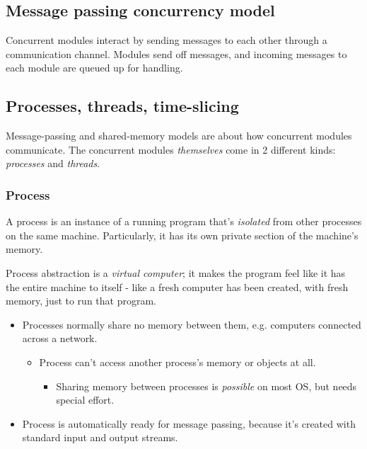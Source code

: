 \documentclass[10pt]{amsart}
\begin{document}
\subsection{Message passing concurrency model}

Concurrent modules interact by sending messages to each other through a communication channel. Modules send off messages, and incoming messages to each module are queued up for handling.

\subsection{Processes, threads, time-slicing}

Message-passing and shared-memory models are about how concurrent modules communicate. The concurrent modules \emph{themselves} come in 2 different kinds: \emph{processes} and \emph{threads}. \\

\subsubsection{Process}

A process is an instance of a running program that's \emph{isolated} from other processes on the same machine. Particularly, it has its own private section of the machine's memory.

Process abstraction is a \emph{virtual computer}; it makes the program feel like it has the entire machine to itself - like a fresh computer has been created, with fresh memory, just to run that program.

\begin{itemize} 
	\item Processes normally share no memory between them, e.g. computers connected across a network.
	\begin{itemize} 
		\item Process can't access another process's memory or objects at all. \\
		\begin{itemize}
			\item Sharing memory between processes is \emph{possible} on most OS, but needs special effort.
		\end{itemize}
	\end{itemize} 
	\item Process is automatically ready for message passing, because it's created with standard input and output streams.
\end{itemize}
\end{document}
